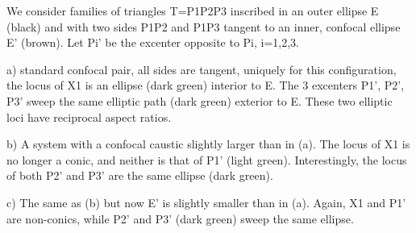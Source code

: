 We consider families of triangles T=P1P2P3 inscribed in an outer ellipse E (black) and with two sides P1P2 and P1P3 tangent to an inner, confocal ellipse E' (brown). Let Pi' be the excenter opposite to Pi, i=1,2,3.

a) standard confocal pair, all sides are tangent, uniquely for this configuration, the locus of X1 is an ellipse (dark green) interior to E. The 3 excenters P1', P2', P3'  sweep the same elliptic path (dark green) exterior to E. These two elliptic loci have reciprocal aspect ratios.

b) A system with a confocal caustic slightly larger than in (a). The locus of X1 is no longer a conic, and neither is that of P1' (light green). Interestingly, the locus of both P2' and P3' are the same ellipse (dark green).

c) The same as (b) but now E' is slightly smaller than in (a). Again, X1 and P1' are non-conics, while P2' and P3' (dark green) sweep the same ellipse.
